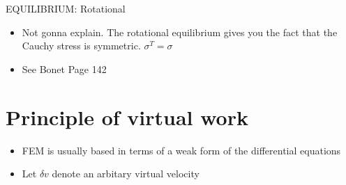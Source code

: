 	\begin{frame}{EQUILIBRIUM: Rotational}
		\begin{itemize}
			\item Not gonna explain. The rotational equilibrium gives you the fact that the Cauchy stress is symmetric. $\sigma^T = \sigma$
			\item See Bonet Page 142
			
		\end{itemize}
	\end{frame}


\section{Principle of virtual work}
	\begin{frame}
	\begin{itemize}
		\item FEM is usually based in terms of a weak form of the differential equations
		\item Let $\delta v$ denote an arbitary virtual velocity
		
	\end{itemize}
	\end{frame}